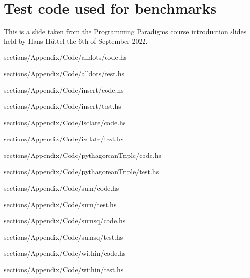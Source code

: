 \chapter{Test code used for benchmarks} \label{chap:TestCode}
This is a slide taken from the Programming Paradigms course introduction slides held by Hans Hüttel the 6th of September 2022.


{sections/Appendix/Code/alldots/code.hs}

{sections/Appendix/Code/alldots/test.hs}


{sections/Appendix/Code/insert/code.hs}

{sections/Appendix/Code/insert/test.hs}


{sections/Appendix/Code/isolate/code.hs}

{sections/Appendix/Code/isolate/test.hs}


{sections/Appendix/Code/pythagoreanTriple/code.hs}

{sections/Appendix/Code/pythagoreanTriple/test.hs}


{sections/Appendix/Code/sum/code.hs}

{sections/Appendix/Code/sum/test.hs}


{sections/Appendix/Code/sumsq/code.hs}

{sections/Appendix/Code/sumsq/test.hs}


{sections/Appendix/Code/within/code.hs}

{sections/Appendix/Code/within/test.hs}



